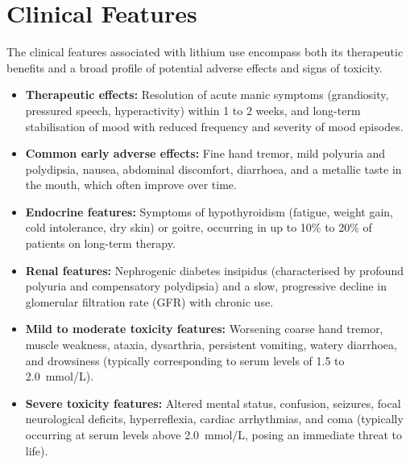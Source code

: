 \section*{Clinical Features}
The clinical features associated with lithium use encompass both its therapeutic benefits and a broad profile of potential adverse effects and signs of toxicity.
\begin{itemize}
    \item \textbf{Therapeutic effects:} Resolution of acute manic symptoms (grandiosity, pressured speech, hyperactivity) within 1 to 2 weeks, and long-term stabilisation of mood with reduced frequency and severity of mood episodes.
    \item \textbf{Common early adverse effects:} Fine hand tremor, mild polyuria and polydipsia, nausea, abdominal discomfort, diarrhoea, and a metallic taste in the mouth, which often improve over time.
    \item \textbf{Endocrine features:} Symptoms of hypothyroidism (fatigue, weight gain, cold intolerance, dry skin) or goitre, occurring in up to 10\% to 20\% of patients on long-term therapy.
    \item \textbf{Renal features:} Nephrogenic diabetes insipidus (characterised by profound polyuria and compensatory polydipsia) and a slow, progressive decline in glomerular filtration rate (GFR) with chronic use.
    \item \textbf{Mild to moderate toxicity features:} Worsening coarse hand tremor, muscle weakness, ataxia, dysarthria, persistent vomiting, watery diarrhoea, and drowsiness (typically corresponding to serum levels of 1.5 to 2.0~mmol/L).
    \item \textbf{Severe toxicity features:} Altered mental status, confusion, seizures, focal neurological deficits, hyperreflexia, cardiac arrhythmias, and coma (typically occurring at serum levels above 2.0~mmol/L, posing an immediate threat to life).
\end{itemize}

